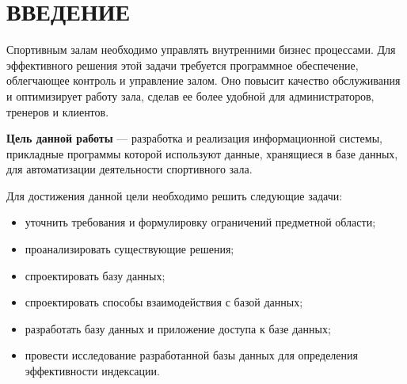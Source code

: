 \chapter*{ВВЕДЕНИЕ}

Спортивным залам необходимо управлять внутренними бизнес процессами. Для эффективного решения этой задачи требуется 
программное обеспечение, облегчающее контроль и управление залом. Оно повысит качество обслуживания и оптимизирует 
работу зала, сделав ее более удобной для администраторов, тренеров и клиентов.

\textbf{Цель данной работы} — разработка и реализация информационной системы, прикладные
программы которой используют данные, хранящиеся в базе данных, для автоматизации
деятельности спортивного зала.

Для достижения данной цели необходимо решить следующие задачи:

\begin{itemize}[label=—]
	\item уточнить требования и формулировку ограничений предметной области;
	\item проанализировать существующие решения;
	\item спроектировать базу данных;
	\item спроектировать способы взаимодействия с базой данных;
	\item разработать базу данных и приложение доступа к базе данных;
	\item провести исследование разработанной базы данных для определения эффективности индексации.
\end{itemize}